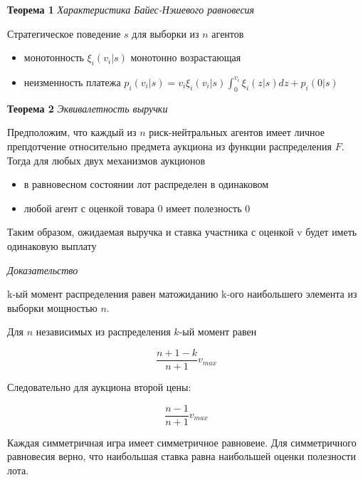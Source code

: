 
\textbf{Теорема 1} \textit{Характеристика Байес-Нэшевого равновесия}

Стратегическое поведение $s$ для выборки из $n$ агентов 

\begin{itemize}
    \item монотонность $\xi_i(v_i|s)$ монотонно возрастающая 
    \item неизменность платежа $p_i(v_i|s) = v_i \xi_i (v_i|s)  \int_0^{v_i} \xi_i(z|s) dz + p_i(0|s)$
\end{itemize}


\textbf{Теорема 2} \textit{Эквивалетность выручки}

Предположим, что каждый из $n$ риск-нейтральных агентов имеет личное препдотчение относительно предмета аукциона из функции распределения $F$. Тогда для любых двух механизмов аукционов

\begin{itemize}
    \item в равновесном состоянии лот распределен в одинаковом 
    \item любой агент с оценкой товара 0 имеет полезность 0
\end{itemize}
Таким образом, ожидаемая выручка и ставка участника с оценкой v будет иметь одинаковую выплату

\textit{Доказательство}

k-ый момент распределения равен матожиданию k-ого наибольшего  элемента из  выборки мощностью $n$. 

Для $n$ независимых из распределения $k$-ый момент равен

$$
    \frac{n+1-k}{n+1} v_{max}
$$

Следовательно для аукциона второй цены:

$$
    \frac{n-1}{n+1} v_{max}
$$

Каждая симметричная игра имеет симметричное равновеие.  Для симметричного равновесия верно, что наибольшая ставка равна наибольшей оценки полезности лота.